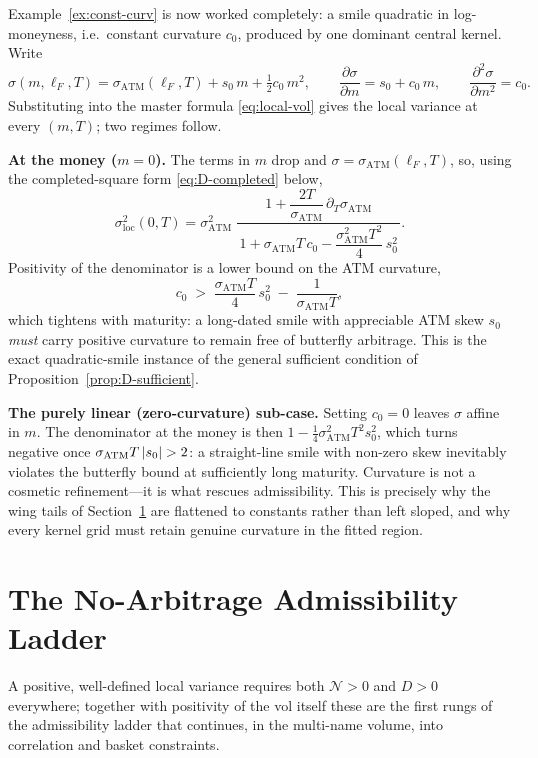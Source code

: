 \documentclass[11pt]{book}
\theoremstyle{plain}
\theoremstyle{definition}
\theoremstyle{remark}
\newcommand{\mln}{m}                             %
\newcommand{\lF}{\ell_F}                         %
\newcommand{\satm}{\sigma_{\mathrm{ATM}}}        %
\newcommand{\sloc}{\sigma_{\mathrm{loc}}}        %
\newcommand{\pd}[2]{\frac{\partial #1}{\partial #2}}          %
\newcommand{\pdd}[2]{\frac{\partial^2 #1}{\partial #2^2}}     %
\DeclarePairedDelimiter{\abs}{\lvert}{\rvert}
\begin{document}
Example~\ref{ex:const-curv} is now worked completely: a smile quadratic in
log-moneyness, i.e.\ constant curvature $c_0$, produced by one dominant central
kernel. Write
\[
\sigma(\mln,\lF,T) = \satm(\lF,T) + s_0\,\mln + \tfrac12 c_0\,\mln^2,
\qquad
\pd{\sigma}{\mln} = s_0 + c_0\,\mln,
\qquad
\pdd{\sigma}{\mln} = c_0.
\]
Substituting into the master formula \eqref{eq:local-vol} gives the local
variance at every $(\mln,T)$; two regimes follow.

\medskip
\noindent\textbf{At the money ($\mln = 0$).} The terms in $\mln$ drop and
$\sigma = \satm(\lF,T)$, so, using the completed-square form
\eqref{eq:D-completed} below,
\begin{equation}\label{eq:quad-atm}
\sloc^2(0,T)
= \satm^2\;
\frac{\,1 + \dfrac{2T}{\satm}\,\partial_T\satm\,}
{\,1 + \satm T\,c_0 - \dfrac{\satm^2 T^2}{4}\,s_0^2\,}.
\end{equation}
Positivity of the denominator is a lower bound on the ATM curvature,
\begin{equation}\label{eq:quad-constraint}
c_0 \;>\; \frac{\satm T}{4}\,s_0^2 \;-\; \frac{1}{\satm T},
\end{equation}
which tightens with maturity: a long-dated smile with appreciable ATM skew
$s_0$ \emph{must} carry positive curvature to remain free of butterfly
arbitrage. This is the exact quadratic-smile instance of the general
sufficient condition of Proposition~\ref{prop:D-sufficient}.

\medskip
\noindent\textbf{The purely linear (zero-curvature) sub-case.} Setting
$c_0 = 0$ leaves $\sigma$ affine in $\mln$. The denominator at the money is then
$1 - \tfrac14\satm^2 T^2 s_0^2$, which turns negative once
$\satm T\,\abs{s_0} > 2$: a straight-line smile with non-zero skew inevitably
violates the butterfly bound at sufficiently long maturity. Curvature is not a
cosmetic refinement---it is what rescues admissibility. This is precisely why
the wing tails of Section~\ref{sec:no-arb} are flattened to constants rather
than left sloped, and why every kernel grid must retain genuine curvature in
the fitted region.

\section{The No-Arbitrage Admissibility Ladder}
\label{sec:no-arb}

A positive, well-defined local variance requires both $\mathcal N > 0$ and
$D > 0$ everywhere; together with positivity of the vol itself these are the
first rungs of the admissibility ladder that continues, in the multi-name
volume, into correlation and basket constraints.
\end{document}
